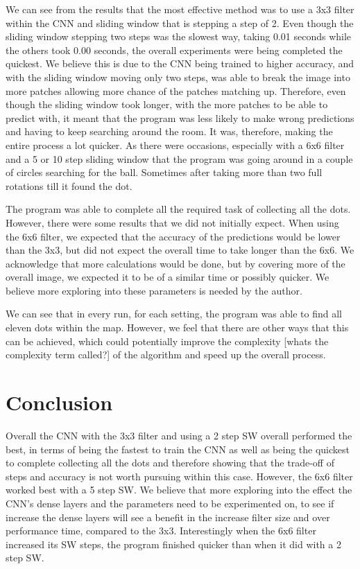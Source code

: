 \documentclass[a4paper,10pt]{article}
\begin{document}
We can see from the results that the most effective method was to use a 3x3 filter within the CNN and sliding window that is stepping a step of 2. Even though the sliding window stepping two steps was the slowest way, taking 0.01 seconds while the others took 0.00 seconds, the overall experiments were being completed the quickest. We believe this is due to the CNN being trained to higher accuracy, and with the sliding window moving only two steps, was able to break the image into more patches allowing more chance of the patches matching up. Therefore, even though the sliding window took longer, with the more patches to be able to predict with, it meant that the program was less likely to make wrong predictions and having to keep searching around the room. It was, therefore, making the entire process a lot quicker. As there were occasions, especially with a 6x6 filter and a 5 or 10 step sliding window that the program was going around in a couple of circles searching for the ball. Sometimes after taking more than two full rotations till it found the dot.

The program was able to complete all the required task of collecting all the dots. However, there were some results that we did not initially expect. When using the 6x6 filter, we expected that the accuracy of the predictions would be lower than the 3x3, but did not expect the overall time to take longer than the 6x6. We acknowledge that more calculations would be done, but by covering more of the overall image, we expected it to be of a similar time or possibly quicker. We believe more exploring into these parameters is needed by the author.

We can see that in every run, for each setting, the program was able to find all eleven dots within the map. However, we feel that there are other ways that this can be achieved, which could potentially improve the complexity [whats the complexity term called?] of the algorithm and speed up the overall process. 

\section{Conclusion}

Overall the CNN with the 3x3 filter and using a 2 step SW overall performed the best, in terms of being the fastest to train the CNN as well as being the quickest to complete collecting all the dots and therefore showing that the trade-off of steps and accuracy is not worth pursuing within this case. However, the 6x6 filter worked best with a 5 step SW. We believe that more exploring into the effect the CNN's dense layers and the parameters need to be experimented on, to see if increase the dense layers will see a benefit in the increase filter size and over performance time, compared to the 3x3. Interestingly when the 6x6 filter increased its SW steps, the program finished quicker than when it did with a 2 step SW. 
\end{document}
